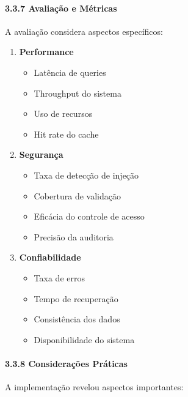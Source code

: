 \documentclass[
]{article}
\providecommand{\tightlist}{%
  \setlength{\itemsep}{0pt}\setlength{\parskip}{0pt}}
\begin{document}
\paragraph{3.3.7 Avaliação e
Métricas}\label{avaliauxe7uxe3o-e-muxe9tricas-2}

A avaliação considera aspectos específicos:

\begin{enumerate}
\def\labelenumi{\arabic{enumi}.}
\item
  \textbf{Performance}

  \begin{itemize}
  \tightlist
  \item
    Latência de queries
  \item
    Throughput do sistema
  \item
    Uso de recursos
  \item
    Hit rate do cache
  \end{itemize}
\item
  \textbf{Segurança}

  \begin{itemize}
  \tightlist
  \item
    Taxa de detecção de injeção
  \item
    Cobertura de validação
  \item
    Eficácia do controle de acesso
  \item
    Precisão da auditoria
  \end{itemize}
\item
  \textbf{Confiabilidade}

  \begin{itemize}
  \tightlist
  \item
    Taxa de erros
  \item
    Tempo de recuperação
  \item
    Consistência dos dados
  \item
    Disponibilidade do sistema
  \end{itemize}
\end{enumerate}

\paragraph{3.3.8 Considerações
Práticas}\label{considerauxe7uxf5es-pruxe1ticas-2}

A implementação revelou aspectos importantes:
\end{document}

